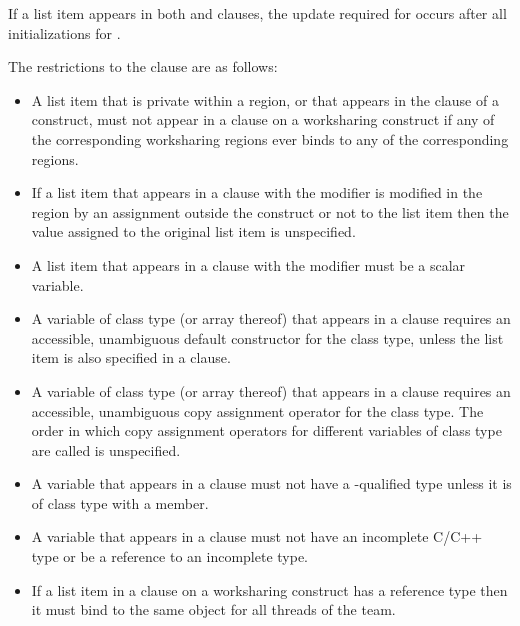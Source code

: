 {{{{If a list item appears in both  and  clauses, the update 
required for  occurs after all initializations for .

\restrictions
The restrictions to the  clause are as follows:

\begin{itemize}
\item A list item that is private within a  region, or
that appears in the  clause of a 
construct, must not appear in a  clause on a
worksharing construct if any of the corresponding
worksharing regions ever binds to any of the corresponding
 regions.

\item If a list item that appears in a  clause with the
 modifier is modified in the region by an assignment
outside the construct or not to the list item then the value assigned to
the original list item is unspecified.

\item A list item that appears in a  clause with the
 modifier must be a scalar variable.

\cppspecificstart
\item A variable of class type (or array thereof) that appears in a  clause 
requires an accessible, unambiguous default constructor for the class type, unless the 
list item is also specified in a  clause. 

\item A variable of class type (or array thereof) that appears in a  clause 
requires an accessible, unambiguous copy assignment operator for the class type. The 
order in which copy assignment operators for different variables of class type are 
called is unspecified.
\cppspecificend

\ccppspecificstart
\item A variable that appears in a  clause must not have a -qualified 
type unless it is of class type with a  member. 

\item A variable that appears in a  clause must not have an incomplete C/C++ type or be a reference to an incomplete type.

\item If a list item in a  clause on a worksharing
construct has a reference type then it must bind to the same object for all threads of the team.
\ccppspecificend


\end{itemize}}}}}
